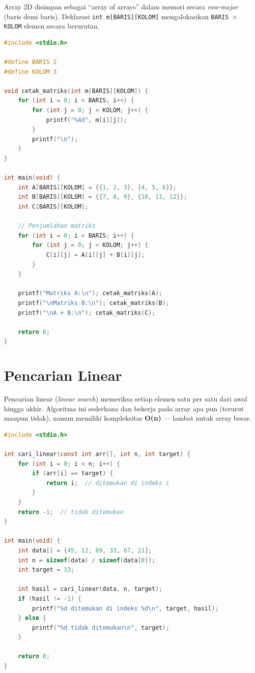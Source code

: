 \documentclass[../main.tex]{subfiles}
\begin{document}
Array 2D disimpan sebagai ``array of arrays'' dalam memori secara \textit{row-major} (baris demi baris). Deklarasi \texttt{int m[BARIS][KOLOM]} mengalokasikan \texttt{BARIS $\times$ KOLOM} elemen secara berurutan.

\begin{lstlisting}[language=C,caption=Penjumlahan dua matriks $2\times 3$]
#include <stdio.h>

#define BARIS 2
#define KOLOM 3

void cetak_matriks(int m[BARIS][KOLOM]) {
    for (int i = 0; i < BARIS; i++) {
        for (int j = 0; j < KOLOM; j++) {
            printf("%4d", m[i][j]);
        }
        printf("\n");
    }
}

int main(void) {
    int A[BARIS][KOLOM] = {{1, 2, 3}, {4, 5, 6}};
    int B[BARIS][KOLOM] = {{7, 8, 9}, {10, 11, 12}};
    int C[BARIS][KOLOM];
    
    // Penjumlahan matriks
    for (int i = 0; i < BARIS; i++) {
        for (int j = 0; j < KOLOM; j++) {
            C[i][j] = A[i][j] + B[i][j];
        }
    }
    
    printf("Matriks A:\n"); cetak_matriks(A);
    printf("\nMatriks B:\n"); cetak_matriks(B);
    printf("\nA + B:\n"); cetak_matriks(C);
    
    return 0;
}
\end{lstlisting}



\section{Pencarian Linear}

Pencarian linear (\textit{linear search}) memeriksa setiap elemen satu per satu dari awal hingga akhir. Algoritma ini sederhana dan bekerja pada array apa pun (terurut maupun tidak), namun memiliki kompleksitas \textbf{O(n)} --- lambat untuk array besar.

\begin{lstlisting}[language=C,caption=Pencarian linear]
#include <stdio.h>

int cari_linear(const int arr[], int n, int target) {
    for (int i = 0; i < n; i++) {
        if (arr[i] == target) {
            return i;  // ditemukan di indeks i
        }
    }
    return -1;  // tidak ditemukan
}

int main(void) {
    int data[] = {45, 12, 89, 33, 67, 21};
    int n = sizeof(data) / sizeof(data[0]);
    int target = 33;
    
    int hasil = cari_linear(data, n, target);
    if (hasil != -1) {
        printf("%d ditemukan di indeks %d\n", target, hasil);
    } else {
        printf("%d tidak ditemukan\n", target);
    }
    
    return 0;
}
\end{lstlisting}
\end{document}
